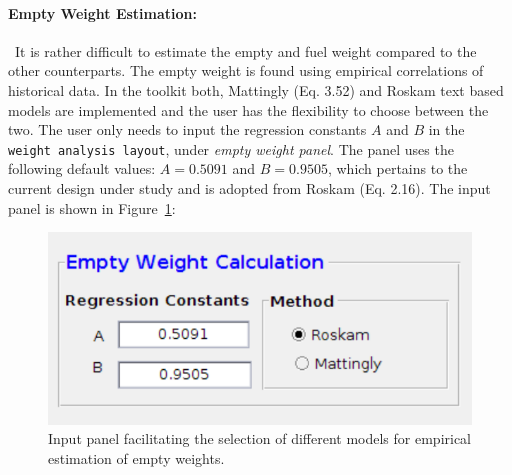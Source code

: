 \documentclass[pdftex,11pt,letter]{article}
\begin{document}
\paragraph{Empty Weight Estimation:}~It is rather difficult to estimate the empty and fuel weight compared to the other counterparts. The empty weight is found using empirical correlations of  historical data. In the toolkit both, Mattingly\cite{MattinglyText} (Eq. 3.52) and Roskam\cite{RoskamText} text based models are implemented and the user has the flexibility to choose between the two. The user only needs to input the regression constants $A$ and $B$ in the \texttt{weight analysis layout}, under \textit{empty weight panel}. The panel uses the following default values: $A=0.5091$ and $B=0.9505$, which pertains to the current design under study and is adopted from Roskam\cite{RoskamText} (Eq. 2.16). The input panel is shown in Figure~\ref{panel_empty_weight}:
 \begin{figure}[h!]
	\centering
	\includegraphics[scale=0.5]{figures/empty_weight_panel.pdf}
	\caption{Input panel facilitating the selection of different models for empirical estimation of empty weights.}
	\label{panel_empty_weight}
\end{figure}
\end{document}
